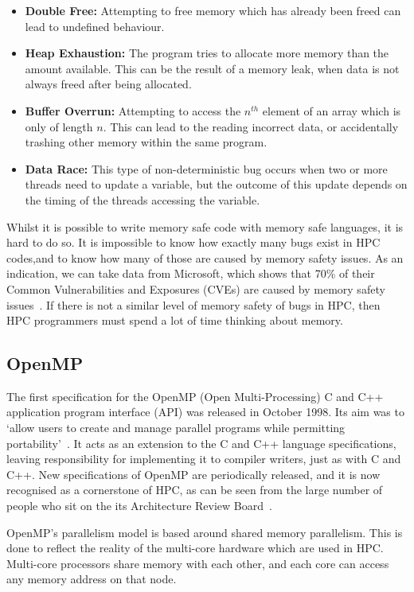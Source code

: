 \begin{itemize}
    \item \textbf{Double Free:} Attempting to free memory which has already been freed can lead to undefined behaviour.
    \item \textbf{Heap Exhaustion:} The program tries to allocate more memory than the amount available. This can be the result of a memory leak, when data is not always freed after being allocated.
    \item \textbf{Buffer Overrun:} Attempting to access the $n^{th}$ element of an array which is only of length $n$. This can lead to the reading incorrect data, or accidentally trashing other memory within the same program.
    \item \textbf{Data Race:} This type of non-deterministic bug occurs when two or more threads need to update a variable, but the outcome of this update depends on the timing of the threads accessing the variable. 
\end{itemize}

Whilst it is possible to write memory safe code with memory safe languages, it is hard to do so. It is impossible to know how exactly many bugs exist in HPC codes,and to know how many of those are caused by memory safety issues.
As an indication, we can take data from Microsoft, which shows that 70\% of their Common Vulnerabilities and Exposures (CVEs) are caused by memory safety issues~\cite{MicroBugs}. If there is not a similar level of memory safety of bugs in HPC, then HPC programmers must spend a lot of time thinking about memory.

\subsection{OpenMP}
The first specification for the OpenMP (Open Multi-Processing) C and C++ application program interface (API) was released in October 1998. Its aim was to `allow users to create and manage parallel programs while permitting portability'~\cite{OpenMPSpec}. It acts as an extension to the C and C++ language specifications, leaving responsibility for implementing it to compiler writers, just as with C and C++. New specifications of OpenMP are periodically released, and it is now recognised as a cornerstone of HPC, as can be seen from the large number of people who sit on the its Architecture Review Board~\cite{OpenMPARB}.

OpenMP's parallelism model is based around shared memory parallelism. This is done to reflect the reality of the multi-core hardware which are used in HPC. Multi-core processors share memory with each other, and each core can access any memory address on that node.  

